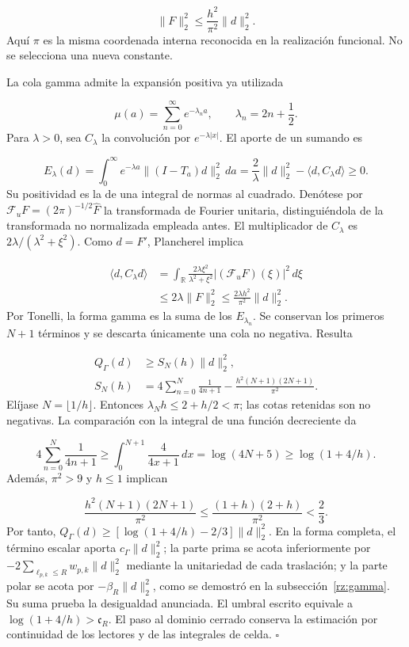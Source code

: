 \[
\|F\|_2^2\leq\frac{h^2}{\pi^2}\|d\|_2^2.
\]
Aquí \(\pi\) es la misma coordenada interna reconocida en la realización funcional. No se selecciona una nueva constante.

La cola gamma admite la expansión positiva ya utilizada

\[
\mu(a)=\sum_{n=0}^{\infty}e^{-\lambda_n a},
\qquad \lambda_n=2n+\frac12.
\]
Para \(\lambda>0\), sea \(C_\lambda\) la convolución por \(e^{-\lambda|x|}\). El aporte de un sumando es

\[
E_\lambda(d)=\int_0^\infty e^{-\lambda a}
\|(I-T_a)d\|_2^2\,da
=\frac2\lambda\|d\|_2^2-
\langle d,C_\lambda d\rangle\geq0.
\]
Su positividad es la de una integral de normas al cuadrado. Denótese por \(\mathcal F_u F=(2\pi)^{-1/2}\widehat F\) la transformada de Fourier unitaria, distinguiéndola de la transformada no normalizada empleada antes. El multiplicador de \(C_\lambda\) es \(2\lambda/(\lambda^2+\xi^2)\). Como \(d=F'\), Plancherel implica

\[
\begin{aligned}
\langle d,C_\lambda d\rangle
&=\int_{\mathbb R}
\frac{2\lambda\xi^2}{\lambda^2+\xi^2}
|(\mathcal F_u F)(\xi)|^2\,d\xi\\
&\leq2\lambda\|F\|_2^2
\leq\frac{2\lambda h^2}{\pi^2}\|d\|_2^2.
\end{aligned}
\]
Por Tonelli, la forma gamma es la suma de los \(E_{\lambda_n}\). Se conservan los primeros \(N+1\) términos y se descarta únicamente una cola no negativa. Resulta

\[
\begin{aligned}
Q_\Gamma(d)&\geq S_N(h)\|d\|_2^2,\\
S_N(h)&=4\sum_{n=0}^N\frac1{4n+1}
-\frac{h^2(N+1)(2N+1)}{\pi^2}.
\end{aligned}
\]
Elíjase \(N=\lfloor1/h\rfloor\). Entonces \(\lambda_N h\leq2+h/2<\pi\); las cotas retenidas son no negativas. La comparación con la integral de una función decreciente da

\[
4\sum_{n=0}^N\frac1{4n+1}
\geq\int_0^{N+1}\frac4{4x+1}\,dx
=\log(4N+5)\geq\log(1+4/h).
\]
Además, \(\pi^2>9\) y \(h\leq1\) implican

\[
\frac{h^2(N+1)(2N+1)}{\pi^2}
\leq\frac{(1+h)(2+h)}{\pi^2}<\frac23.
\]
Por tanto, \(Q_\Gamma(d)\geq[\log(1+4/h)-2/3]\|d\|_2^2\). En la forma completa, el término escalar aporta \(c_\Gamma\|d\|_2^2\); la parte prima se acota inferiormente por \(-2\sum_{\ell_{p,k}\leq R}w_{p,k}\|d\|_2^2\) mediante la unitariedad de cada traslación; y la parte polar se acota por \(-\beta_R\|d\|_2^2\), como se demostró en la subsección~\ref{rz:gamma}. Su suma prueba la desigualdad anunciada. El umbral escrito equivale a \(\log(1+4/h)>\mathfrak c_R\). El paso al dominio cerrado conserva la estimación por continuidad de los lectores y de las integrales de celda. \hfill\(\square\)

